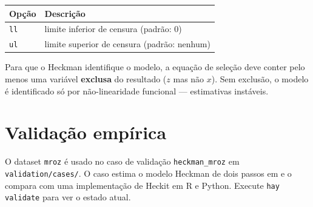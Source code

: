 \begin{center}
\begin{tabular}{ll}
\toprule
\textbf{Opção} & \textbf{Descrição} \\
\midrule
\texttt{ll} & limite inferior de censura (padrão: 0) \\
\texttt{ul} & limite superior de censura (padrão: nenhum) \\
\bottomrule
\end{tabular}
\end{center}

\begin{aviso}
  Para que o Heckman identifique o modelo, a equação de seleção deve conter
  pelo menos uma variável \textbf{exclusa} do resultado ($z$ mas não $x$).
  Sem exclusão, o modelo é identificado só por não-linearidade funcional —
  estimativas instáveis.
\end{aviso}

\section{Validação empírica}

O dataset \texttt{mroz} é usado no caso de validação
\texttt{heckman_mroz} em \texttt{validation/cases/}. O caso estima o modelo
Heckman de dois passos em \hayashi{} e o compara com uma implementação de
Heckit em R e Python. Execute \lstinline{hay validate} para ver o estado
atual.
